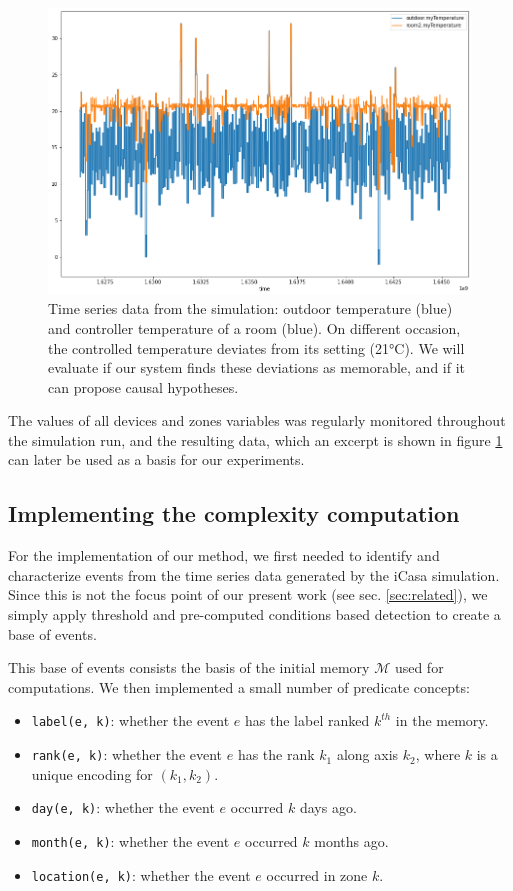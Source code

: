 \documentclass[conference]{IEEEtran}
\begin{document}
\begin{figure}[ht]
  \includegraphics[width=\linewidth]{figures/ts_example}
  \caption{Time series data from the simulation: outdoor temperature (blue) and
    controller temperature of a room (blue). On different occasion, the
    controlled temperature deviates from its setting (21°C). We will evaluate if
  our system finds these deviations as memorable, and if it can propose causal
  hypotheses.}
  \label{fig:ts_example}
\end{figure}

The values of all devices and zones variables was regularly monitored throughout
the simulation run, and the resulting data, which an excerpt is shown in figure
\ref{fig:ts_example} can later be used as a basis for our experiments.


\subsection{Implementing the complexity computation}

For the implementation of our method, we first needed to identify and
characterize events from the time series data generated by the iCasa simulation.
Since this is not the focus point of our present work (see sec.
\ref{sec:related}), we simply apply threshold and pre-computed conditions based
detection to create a base of events.

This base of events consists the basis of the initial memory $\mathcal{M}$ used
for computations.
We then implemented a small number of predicate concepts:
\begin{itemize}
        \item \texttt{label(e, k)}: whether the event $e$ has the label ranked
        $k^{th}$ in the memory.
        \item \texttt{rank(e, k)}: whether the event $e$ has the rank $k_{1}$
        along axis $k_{2}$, where $k$ is a unique encoding for $(k_{1}, k_{2})$.
        \item \texttt{day(e, k)}: whether the event $e$ occurred $k$ days ago.
        \item \texttt{month(e, k)}: whether the event $e$ occurred $k$ months
        ago.
        \item \texttt{location(e, k)}: whether the event $e$ occurred in zone
        $k$.
\end{itemize}
\end{document}
